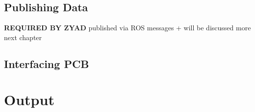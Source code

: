 


\newpage

\subsection{Publishing Data}
\textbf{REQUIRED BY ZYAD}
published via ROS messages + will be discussed more next chapter

\subsection{Interfacing PCB}


\section{Output} %











% 